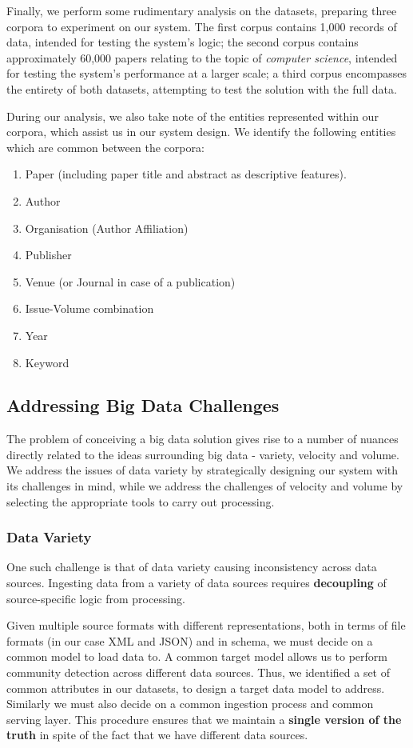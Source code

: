 \documentclass[10pt,journal,final,a4paper]{IEEEtran}
\begin{document}
Finally, we perform some rudimentary analysis on the datasets, preparing three corpora to experiment on our system. The first corpus contains 1,000 records of data, intended for testing the system's logic; the second corpus contains approximately 60,000 papers relating to the topic of \textit{computer science}, intended for testing the system's performance at a larger scale; a third corpus encompasses the entirety of both datasets, attempting to test the solution with the full data.

During our analysis, we also take note of the entities represented within our corpora, which assist us in our system design. We identify the following entities which are common between the corpora:
\begin{enumerate}
\item Paper (including paper title and abstract as descriptive features).
\item Author
\item Organisation (Author Affiliation)
\item Publisher
\item Venue (or Journal in case of a publication)
\item Issue-Volume combination
\item Year
\item Keyword
\end{enumerate}


\subsection{Addressing Big Data Challenges}
The problem of conceiving a big data solution gives rise to a number of nuances directly related to the ideas surrounding big data - variety, velocity and volume. We address the issues of data variety by strategically designing our system with its challenges in mind, while we address the challenges of velocity and volume by selecting the appropriate tools to carry out processing.

\subsubsection{Data Variety}One such challenge is that of data variety causing inconsistency across data sources. Ingesting data from a variety of data sources requires \textbf{decoupling} of source-specific logic from processing. 

Given multiple source formats with different representations, both in terms of file formats (in our case XML and JSON) and in schema, we must decide on a common model to load data to. A common target model allows us to perform community detection across different data sources. Thus, we identified a set of common attributes in our datasets, to design a target data model to address. Similarly we must also decide on a common ingestion process and common serving layer. This procedure ensures that we maintain a \textbf{single version of the truth} in spite of the fact that we have different data sources.
\end{document}
